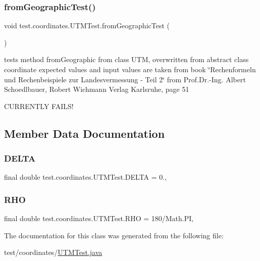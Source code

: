 \subsubsection{\texorpdfstring{from\+Geographic\+Test()}{fromGeographicTest()}}
{\footnotesize\ttfamily void test.\+coordinates.\+U\+T\+M\+Test.\+from\+Geographic\+Test (\begin{DoxyParamCaption}{ }\end{DoxyParamCaption})}



tests method from\+Geographic from class U\+TM, overwritten from abstract class coordinate expected values and input values are taken from book \char`\"{}\+Rechenformeln und Rechenbeispiele zur Landesvermessung -\/ Teil 2\char`\"{} from Prof.\+Dr.-\/\+Ing. Albert Schoedlbauer, Robert Wichmann Verlag Karlsruhe, page 51 

C\+U\+R\+R\+E\+N\+T\+LY F\+A\+I\+L\+S! 

\subsection{Member Data Documentation}
\mbox{\label{classtest_1_1coordinates_1_1_u_t_m_test_ab622b84892fbc78c561d318e27027b5f}} 
\subsubsection{\texorpdfstring{D\+E\+L\+TA}{DELTA}}
{\footnotesize\ttfamily final double test.\+coordinates.\+U\+T\+M\+Test.\+D\+E\+L\+TA = 0.\hspace{0.3cm}{\ttfamily [static]}, {\ttfamily [private]}}

\mbox{\label{classtest_1_1coordinates_1_1_u_t_m_test_af2bba3a46cbc36b4582eb2c835ff9398}} 
\subsubsection{\texorpdfstring{R\+HO}{RHO}}
{\footnotesize\ttfamily final double test.\+coordinates.\+U\+T\+M\+Test.\+R\+HO = 180/Math.\+PI\hspace{0.3cm}{\ttfamily [static]}, {\ttfamily [private]}}



The documentation for this class was generated from the following file\+:\begin{DoxyCompactItemize}
\item 
test/coordinates/\hyperlink{_u_t_m_test_8java}{U\+T\+M\+Test.\+java}\end{DoxyCompactItemize}
